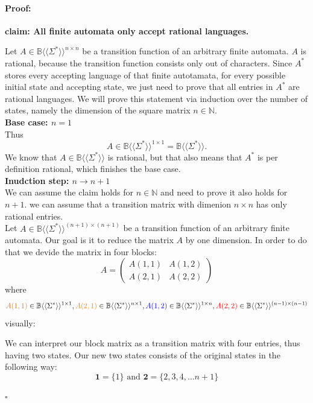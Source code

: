 \documentclass[12pt,letterpaper]{article}
\newenvironment{proof}{\paragraph{Proof:}}{\hfill$\square$}
\newcommand{\fps}[1] {
\mathbb{#1}\langle \langle \Sigma^* \rangle \rangle
}
\begin{document}
\begin{proof}
  \begin{center}
    {\bf claim: All finite automata only accept rational languages.}
  \end{center}
  Let $A \in \fps{B}^{n \times n}$ be a transition function of an
  arbitrary finite automata. $A$ is rational, because the transition
  function consists only out of characters. Since $A^*$ stores every accepting
  language of that finite autotamata, for every possible initial
  state and accepting state, we just need to prove that all entries
  in $A^*$ are rational languages.
  We will prove this statement via induction over the number of 
  states, namely the dimension of the square matrix $n \in \mathbb{N}$.\\
  {\bf Base case: $n=1$}\\
  Thus
  \[
    A \in \fps{B}^{1 \times 1} = \fps{B}.
  \]
  We know that $A \in \fps{B}$ is rational, but that also means
  that $A^*$ is per definition rational, which finishes the base case.\\
  {\bf Inudction step: $n \to n+1$}\\
  We can assume the claim holds for $n \in \mathbb{N}$ and need to prove it
also holds for $n+1$. we can assume that a transition matrix with dimenion 
$n \times n$ has only rational entries. \\
Let $A \in \fps{B}^{(n+1) \times (n+1)}$ be a transition function of an
arbitrary finite automata. 
Our goal is it to reduce the matrix $A$ by one dimension. In order to do
that we devide the matrix in four blocks:
\[
  A = 
  \begin{pmatrix}
    A(1,1) & A(1,2) \\
    A(2,1) & A(2,2)
  \end{pmatrix}
\]
where 
\[ 
  \textcolor{brown}{ A(1,1) }\in \fps{B}^{1 \times 1},
  \textcolor{orange}{ A(2,1)} \in \fps{B}^{n \times 1}, 
  \textcolor{blue}{A(1,2)} \in \fps{B}^{1 \times n},
  \textcolor{red}{A(2,2)} \in \fps{B}^{(n-1) \times (n-1)}
\]
visually:
\begin{center}
\end{center}
We can interpret our block matrix as a transition matrix with four entries,
thus having two states. Our new two states consists of the original states
in the following way:
\[
  \mathbf{1} = \{1\} \text{ and } \mathbf{2} = \{2,3,4, \dots n + 1\}
\]

  


\end{proof}
  
\end{document}
